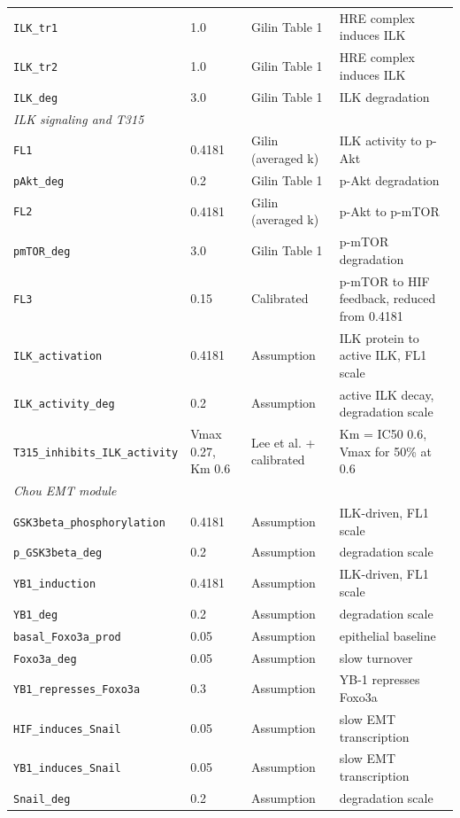 \begin{longtable}{@{}llp{2.6cm}p{4.6cm}@{}}
\texttt{ILK\_tr1} & 1.0 & Gilin Table 1 & HRE complex induces ILK \\
\texttt{ILK\_tr2} & 1.0 & Gilin Table 1 & HRE complex induces ILK \\
\texttt{ILK\_deg} & 3.0 & Gilin Table 1 & ILK degradation \\
\midrule
\multicolumn{4}{l}{\textit{ILK signaling and T315}} \\
\texttt{FL1} & 0.4181 & Gilin (averaged k) & ILK activity to p-Akt \\
\texttt{pAkt\_deg} & 0.2 & Gilin Table 1 & p-Akt degradation \\
\texttt{FL2} & 0.4181 & Gilin (averaged k) & p-Akt to p-mTOR \\
\texttt{pmTOR\_deg} & 3.0 & Gilin Table 1 & p-mTOR degradation \\
\texttt{FL3} & 0.15 & Calibrated & p-mTOR to HIF feedback, reduced from 0.4181 \\
\texttt{ILK\_activation} & 0.4181 & Assumption & ILK protein to active ILK, FL1 scale \\
\texttt{ILK\_activity\_deg} & 0.2 & Assumption & active ILK decay, degradation scale \\
\texttt{T315\_inhibits\_ILK\_activity} & Vmax 0.27, Km 0.6 & Lee et al. + calibrated & Km = IC50 0.6, Vmax for 50\% at 0.6 \\
\midrule
\multicolumn{4}{l}{\textit{Chou EMT module}} \\
\texttt{GSK3beta\_phosphorylation} & 0.4181 & Assumption & ILK-driven, FL1 scale \\
\texttt{p\_GSK3beta\_deg} & 0.2 & Assumption & degradation scale \\
\texttt{YB1\_induction} & 0.4181 & Assumption & ILK-driven, FL1 scale \\
\texttt{YB1\_deg} & 0.2 & Assumption & degradation scale \\
\texttt{basal\_Foxo3a\_prod} & 0.05 & Assumption & epithelial baseline \\
\texttt{Foxo3a\_deg} & 0.05 & Assumption & slow turnover \\
\texttt{YB1\_represses\_Foxo3a} & 0.3 & Assumption & YB-1 represses Foxo3a \\
\texttt{HIF\_induces\_Snail} & 0.05 & Assumption & slow EMT transcription \\
\texttt{YB1\_induces\_Snail} & 0.05 & Assumption & slow EMT transcription \\
\texttt{Snail\_deg} & 0.2 & Assumption & degradation scale \\

\end{longtable}
